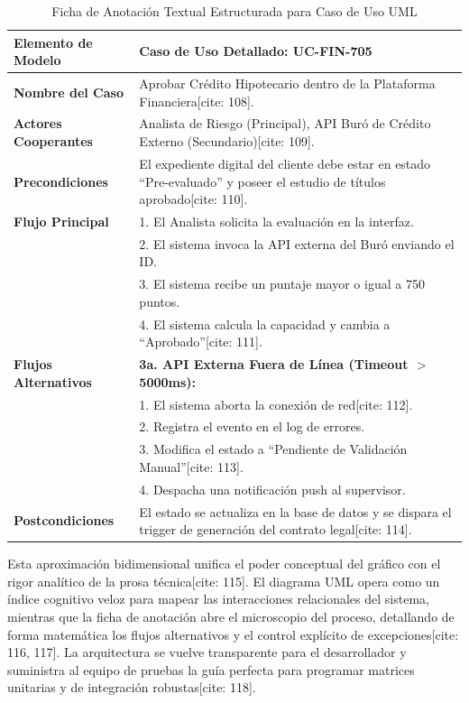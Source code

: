 \documentclass[11pt,a4paper]{article}
\begin{document}
	\begin{table}[htbp]
		\centering
		\caption{Ficha de Anotación Textual Estructurada para Caso de Uso UML}
		\label{tab:uc}
		\begin{tabular}{lp{11cm}}
			\toprule
			\textbf{Elemento de Modelo} & \textbf{Caso de Uso Detallado: UC-FIN-705} \\ \midrule
			\textbf{Nombre del Caso} & Aprobar Crédito Hipotecario dentro de la Plataforma Financiera[cite: 108]. \\
			\textbf{Actores Cooperantes} & Analista de Riesgo (Principal), API Buró de Crédito Externo (Secundario)[cite: 109]. \\
			\textbf{Precondiciones} & El expediente digital del cliente debe estar en estado ``Pre-evaluado'' y poseer el estudio de títulos aprobado[cite: 110]. \\
			\textbf{Flujo Principal} & 1. El Analista solicita la evaluación en la interfaz.\\
			& 2. El sistema invoca la API externa del Buró enviando el ID.\\
			& 3. El sistema recibe un puntaje mayor o igual a 750 puntos.\\
			& 4. El sistema calcula la capacidad y cambia a ``Aprobado''[cite: 111]. \\
			\textbf{Flujos Alternativos} & \textbf{3a. API Externa Fuera de Línea (Timeout $>$ 5000ms):} \\
			& 1. El sistema aborta la conexión de red[cite: 112]. \\
			& 2. Registra el evento en el log de errores. \\
			& 3. Modifica el estado a ``Pendiente de Validación Manual''[cite: 113]. \\
			& 4. Despacha una notificación push al supervisor. \\
			\textbf{Postcondiciones} & El estado se actualiza en la base de datos y se dispara el trigger de generación del contrato legal[cite: 114]. \\ \bottomrule
		\end{tabular}
	\end{table}
	
	Esta aproximación bidimensional unifica el poder conceptual del gráfico con el rigor analítico de la prosa técnica[cite: 115]. El diagrama UML opera como un índice cognitivo veloz para mapear las interacciones relacionales del sistema, mientras que la ficha de anotación abre el microscopio del proceso, detallando de forma matemática los flujos alternativos y el control explícito de excepciones[cite: 116, 117]. La arquitectura se vuelve transparente para el desarrollador y suministra al equipo de pruebas la guía perfecta para programar matrices unitarias y de integración robustas[cite: 118].
	
\end{document}
